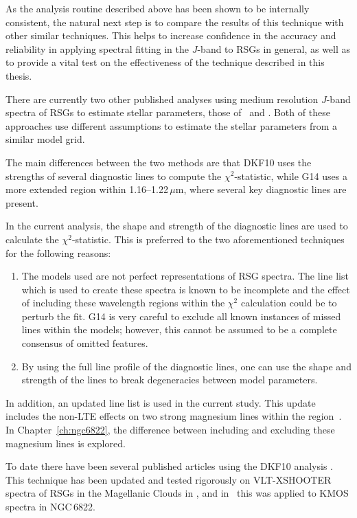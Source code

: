 As the analysis routine described above has been shown to be internally consistent, the natural next step is to compare the results of this technique with other similar techniques.
This helps to increase confidence in the accuracy and reliability in applying spectral fitting in the $J$-band to RSGs in general, as well as to provide a vital test on the effectiveness of the technique described in this thesis.

There are currently two other published analyses using medium resolution $J$-band spectra of RSGs to estimate stellar parameters,
those of~\citet[][DKF10]{2010MNRAS.407.1203D} and
\citet[][G14]{2014PhDT.........G}.
Both of these approaches use different assumptions to estimate the stellar parameters from a similar model grid.

The main differences between the two methods are that DKF10 uses the strengths of several diagnostic lines to compute the $\chi^{2}$-statistic,
while G14 uses a more extended region within 1.16--1.22\,$\mu$m, where several key diagnostic lines are present.

In the current analysis, the shape and strength of the diagnostic lines are used to calculate the $\chi^{2}$-statistic.
This is preferred to the two aforementioned techniques for the following reasons:

\begin{enumerate}
    \item The models used are not perfect representations of RSG spectra.
    The line list which is used to create these spectra is known to be incomplete and the effect of including these wavelength regions within the $\chi^{2}$ calculation could be to perturb the fit. G14 is very careful to exclude all known instances of missed lines within the models; however, this cannot be assumed to be a complete consensus of omitted features.

    \item By using the full line profile of the diagnostic lines, one can use the shape and strength of the lines to break degeneracies between model parameters.
\end{enumerate}

In addition, an updated line list is used in the current study.
This update includes the non-LTE effects on two strong magnesium lines within the region~\citep{2015ApJ...804..113B}.
In Chapter~\ref{ch:ngc6822}, the difference between including and excluding these magnesium lines is explored.

To date there have been several published articles using the DKF10 analysis
\citep{2010MNRAS.407.1203D,2015ApJ...806...21D,2015ApJ...803...14P}.
This technique has been updated and tested rigorously on VLT-XSHOOTER spectra of RSGs in the Magellanic Clouds in
\citet{2015ApJ...806...21D}, and in~\citet[][which Chapter~\ref{ch:ngc6822} is based upon]{2015ApJ...803...14P} this was applied to KMOS spectra in NGC\,6822.

